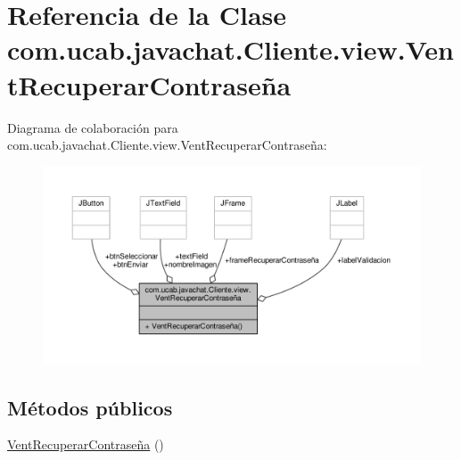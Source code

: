 \hypertarget{classcom_1_1ucab_1_1javachat_1_1_cliente_1_1view_1_1_vent_recuperar_contrase_xC3_xB1a}{\section{Referencia de la Clase com.\-ucab.\-javachat.\-Cliente.\-view.\-Vent\-Recuperar\-Contraseña}
\label{classcom_1_1ucab_1_1javachat_1_1_cliente_1_1view_1_1_vent_recuperar_contrase_xC3_xB1a}
}


Diagrama de colaboración para com.\-ucab.\-javachat.\-Cliente.\-view.\-Vent\-Recuperar\-Contraseña\-:\nopagebreak
\begin{figure}[H]
\begin{center}
\leavevmode
\includegraphics[width=350pt]{classcom_1_1ucab_1_1javachat_1_1_cliente_1_1view_1_1_vent_recuperar_contrase_xC3_xB1a__coll__graph}
\end{center}
\end{figure}
\subsection*{Métodos públicos}
\begin{DoxyCompactItemize}
\item 
\hyperlink{classcom_1_1ucab_1_1javachat_1_1_cliente_1_1view_1_1_vent_recuperar_contrase_xC3_xB1a_a05149abff663644104b70961accbce14}{Vent\-Recuperar\-Contraseña} ()
\end{DoxyCompactItemize}
